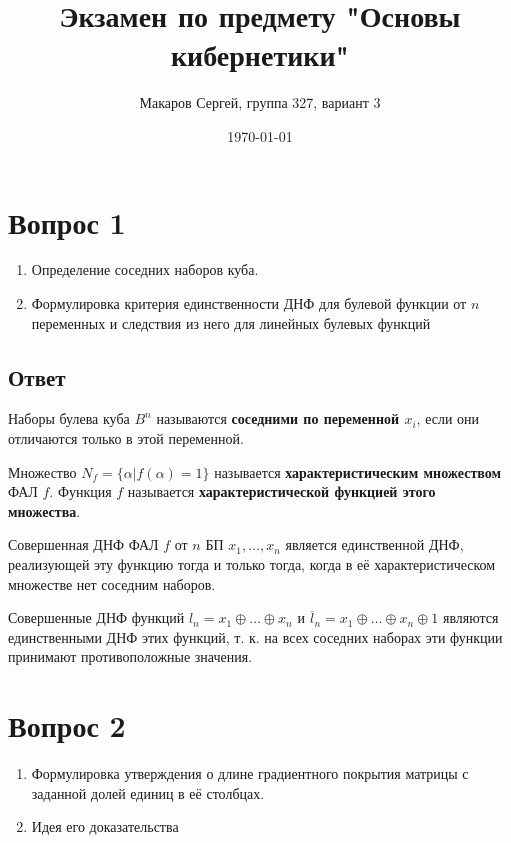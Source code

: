 \documentclass[11pt]{article}
\author{Макаров Сергей, группа 327, вариант 3}
\date{\today}
\title{Экзамен по предмету "Основы кибернетики"}
\def\zall{\setcounter{Def}{0}\setcounter{lem}{0}\setcounter{cnsqnc}{0}\setcounter{th}{0}\setcounter{Cmt}{0}\setcounter{equation}{0}\setcounter{stnmt}{0}}
\newcounter{Def}\setcounter{Def}{0}
\def\df{\par\smallskip\refstepcounter{Def}\textbf{\arabic{Def}}}
\newtheorem*{Def}{Определение \df}
\newcounter{lem}\setcounter{lem}{0}
\def\lm{\par\smallskip\refstepcounter{lem}\textbf{\arabic{lem}}}
\newtheorem*{Lemma}{Лемма \lm}
\newcounter{th}\setcounter{th}{0}
\newcounter{cnsqnc}\setcounter{cnsqnc}{0}
\def\cnsqnc{\par\smallskip\refstepcounter{cnsqnc}\textbf{\arabic{cnsqnc}}}
\newtheorem*{Consequence}{Следствие \cnsqnc}
\newcounter{Cmt}\setcounter{Cmt}{0}
\newcounter{stnmt}\setcounter{stnmt}{0}
\begin{document}
\maketitle
\pagestyle{myheadings}

\section{Вопрос 1}
\label{sec:org3970b25}
\zall  
\begin{enumerate}
\item Определение соседних наборов куба.
\item Формулировка критерия единственности ДНФ для булевой функции от \(n\) переменных и следствия из него для линейных булевых функций
\end{enumerate}
\subsection{Ответ}
\label{sec:org445ed80}
   \begin{Def}
Наборы булева куба $B^n$ называются \textbf{соседними по переменной $x_i$}, если они отличаются только в этой переменной.
   \end{Def}
\begin{Def}
Множество $N_f = \{\alpha | f(\alpha) = 1\}$ называется \textbf{характеристическим множеством} ФАЛ $f$. Функция $f$ называется \textbf{характеристической функцией этого множества}.
\end{Def}
\begin{Lemma}
Совершенная ДНФ ФАЛ $f$ от $n$ БП $x_1, \ldots, x_n$ является единственной ДНФ, реализующей эту функцию тогда и только тогда, когда в её характеристическом множестве нет соседним наборов.
\end{Lemma}
\begin{Consequence}
Совершенные ДНФ функций $l_n = x_1 \oplus \ldots \oplus x_n$ и $\overline{l}_n = x_1 \oplus \ldots \oplus x_n \oplus 1$ являются единственными ДНФ этих функций, т. к. на всех соседних наборах эти функции принимают противоположные значения.
\end{Consequence}
\pagebreak
\section{Вопрос 2}
\label{sec:orgd6124a7}
\zall  
\begin{enumerate}
\item Формулировка утверждения о длине градиентного покрытия матрицы с заданной долей единиц в её столбцах.
\item Идея его доказательства
\end{enumerate}
\end{document}
